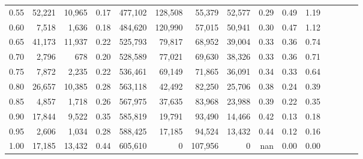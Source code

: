\begin{tabular}{rrrcrrrrrrrrrrr}
0.55 &  52,221 &  10,965 &                                       0.17 &  477,102 &  128,508 &   55,379 &   52,577 &  0.29 &  0.49 &                         1.19 \\
0.60 &   7,518 &   1,636 &                                       0.18 &  484,620 &  120,990 &   57,015 &   50,941 &  0.30 &  0.47 &                         1.12 \\
0.65 &  41,173 &  11,937 &                                       0.22 &  525,793 &   79,817 &   68,952 &   39,004 &  0.33 &  0.36 &                         0.74 \\
0.70 &   2,796 &     678 &                                       0.20 &  528,589 &   77,021 &   69,630 &   38,326 &  0.33 &  0.36 &                         0.71 \\
0.75 &   7,872 &   2,235 &                                       0.22 &  536,461 &   69,149 &   71,865 &   36,091 &  0.34 &  0.33 &                         0.64 \\
0.80 &  26,657 &  10,385 &                                       0.28 &  563,118 &   42,492 &   82,250 &   25,706 &  0.38 &  0.24 &                         0.39 \\
0.85 &   4,857 &   1,718 &                                       0.26 &  567,975 &   37,635 &   83,968 &   23,988 &  0.39 &  0.22 &                         0.35 \\
0.90 &  17,844 &   9,522 &                                       0.35 &  585,819 &   19,791 &   93,490 &   14,466 &  0.42 &  0.13 &                         0.18 \\
0.95 &   2,606 &   1,034 &                                       0.28 &  588,425 &   17,185 &   94,524 &   13,432 &  0.44 &  0.12 &                         0.16 \\
1.00 &  17,185 &  13,432 &                                       0.44 &  605,610 &        0 &  107,956 &        0 &   nan &  0.00 &                         0.00 \\
\bottomrule
\end{tabular}
